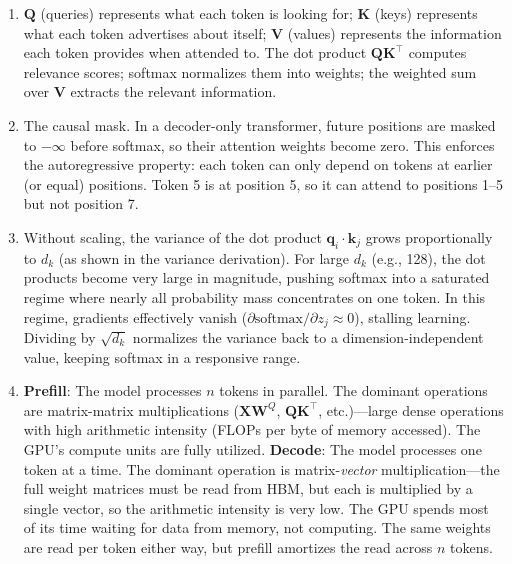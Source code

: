 \begin{enumerate}
    \item $\mathbf{Q}$ (queries) represents what each token is looking for; $\mathbf{K}$ (keys) represents what each token advertises about itself; $\mathbf{V}$ (values) represents the information each token provides when attended to. The dot product $\mathbf{Q}\mathbf{K}^\top$ computes relevance scores; softmax normalizes them into weights; the weighted sum over $\mathbf{V}$ extracts the relevant information.

    \item The causal mask. In a decoder-only transformer, future positions are masked to $-\infty$ before softmax, so their attention weights become zero. This enforces the autoregressive property: each token can only depend on tokens at earlier (or equal) positions. Token 5 is at position 5, so it can attend to positions 1--5 but not position 7.

    \item Without scaling, the variance of the dot product $\mathbf{q}_i \cdot \mathbf{k}_j$ grows proportionally to $d_k$ (as shown in the variance derivation). For large $d_k$ (e.g., 128), the dot products become very large in magnitude, pushing softmax into a saturated regime where nearly all probability mass concentrates on one token. In this regime, gradients effectively vanish ($\partial\text{softmax}/\partial z_j \approx 0$), stalling learning. Dividing by $\sqrt{d_k}$ normalizes the variance back to a dimension-independent value, keeping softmax in a responsive range.

    \item \textbf{Prefill}: The model processes $n$ tokens in parallel. The dominant operations are matrix-matrix multiplications ($\mathbf{X}\mathbf{W}^Q$, $\mathbf{Q}\mathbf{K}^\top$, etc.)---large dense operations with high arithmetic intensity (FLOPs per byte of memory accessed). The GPU's compute units are fully utilized. \textbf{Decode}: The model processes one token at a time. The dominant operation is matrix-\emph{vector} multiplication---the full weight matrices must be read from HBM, but each is multiplied by a single vector, so the arithmetic intensity is very low. The GPU spends most of its time waiting for data from memory, not computing. The same weights are read per token either way, but prefill amortizes the read across $n$ tokens.


\end{enumerate}
